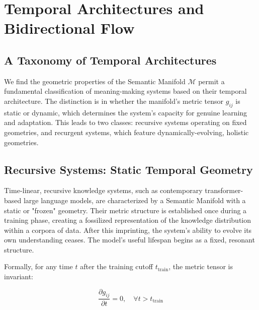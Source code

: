 \chapter{Temporal Architectures and Bidirectional Flow}
\label{9:temporal_architectures_and_bidirectional_flow}


\section{A Taxonomy of Temporal Architectures}
\label{9.1:a_taxonomy_of_temporal_architectures}

We find the geometric properties of the Semantic Manifold \(\mathcal{M}\) permit a fundamental classification of meaning-making systems based on their temporal architecture. The distinction is in whether the manifold's metric tensor \(g_{ij}\) is static or dynamic, which determines the system's capacity for genuine learning and adaptation. This leads to two classes: recursive systems operating on fixed geometries, and recurgent systems, which feature dynamically-evolving, holistic geometries.


\section{Recursive Systems: Static Temporal Geometry}
\label{9.2:recursive_systems_static_temporal_geometry}

Time-linear, recursive knowledge systems, such as contemporary transformer-based large language models, are characterized by a Semantic Manifold with a static or "frozen" geometry. Their metric structure is established once during a training phase, creating a fossilized representation of the knowledge distribution within a corpora of data. After this imprinting, the system's ability to evolve its own understanding ceases. The model's useful lifespan begins as a fixed, resonant structure.

Formally, for any time \(t\) after the training cutoff \(t_{\text{train}}\), the metric tensor is invariant:

\begin{equation}
\frac{\partial g_{ij}}{\partial t} = 0, \quad \forall t > t_{\text{train}}
\end{equation}

